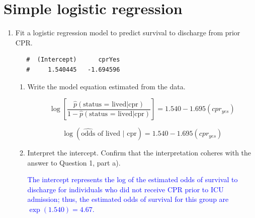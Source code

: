\documentclass[letterpaper,12pt,twoside,]{pinp}
\begin{document}
\hypertarget{simple-logistic-regression}{%
\section{Simple logistic regression}\label{simple-logistic-regression}}

\begin{enumerate}
\def\labelenumi{\arabic{enumi}.}
\setcounter{enumi}{2}
\item
  Fit a logistic regression model to predict survival to discharge from
  prior CPR.

\begin{Shaded}
\begin{Highlighting}[]
\OperatorTok{~}\StringTok{ } \NormalTok{(} \NormalTok{))}\OperatorTok{$}
\end{Highlighting}
\end{Shaded}

  \begin{ShadedResult}
   \begin{verbatim}
   #  (Intercept)      cprYes 
   #     1.540445   -1.694596
   \end{verbatim}
   \end{ShadedResult}

  \begin{enumerate}
  \def\labelenumii{\alph{enumii})}
  \item
    Write the model equation estimated from the data.

    \color{blue}

    \[\log\left[\frac{\hat{p}( \text{status = lived} |\text{cpr})}{1 - \hat{p}(\text{status = lived} | \text{cpr})}\right] = 1.540 -1.695(cpr_{yes})\]

    \[\log (\widehat{\text{odds}}\text{ of lived | cpr}) = 1.540 -1.695(cpr_{yes}) \]

    \color{black}
  \item
    Interpret the intercept. Confirm that the interpretation coheres
    with the answer to Question 1, part a).

    \textcolor{blue}{The intercept represents the log of the estimated odds of survival to discharge for individuals who did not receive CPR prior to ICU admission; thus, the estimated odds of survival for this group are $\exp(1.540) = 4.67$. }
  \end{enumerate}


\end{enumerate}
\end{document}
